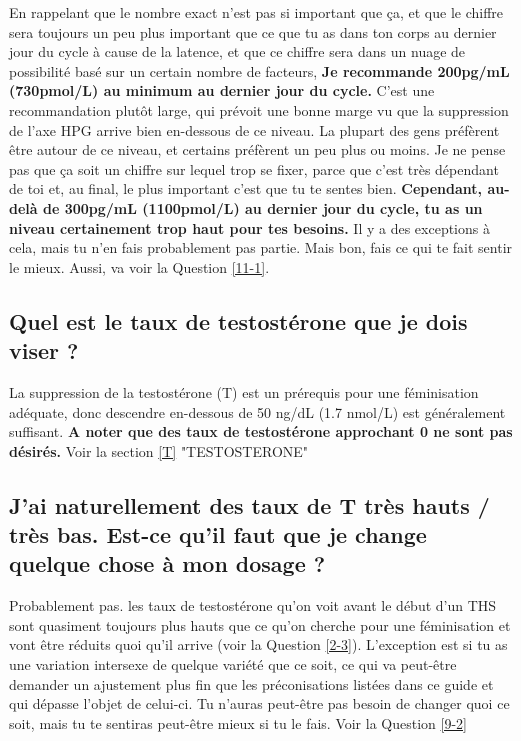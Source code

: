 \documentclass{article}
\begin{document}
En rappelant que le nombre exact n'est pas si important que ça, et que le chiffre sera toujours un peu plus important que ce que tu as dans ton corps au dernier jour du cycle à cause de la latence, et que ce chiffre sera dans un nuage de possibilité basé sur un certain nombre de facteurs, \textbf{Je recommande 200pg/mL (730pmol/L) au minimum au dernier jour du cycle.} C'est une recommandation plutôt large, qui prévoit une bonne marge vu que la suppression de l'axe HPG arrive bien en-dessous de ce niveau. La plupart des gens préfèrent être autour de ce niveau, et certains préfèrent un peu plus ou moins. Je ne pense pas que ça soit un chiffre sur lequel trop se fixer, parce que c'est très dépendant de toi et, au final, le plus important c'est que tu te sentes bien. \textbf{Cependant, au-delà de 300pg/mL (1100pmol/L) au dernier jour du cycle, tu as un niveau certainement trop haut pour tes besoins.} Il y a des exceptions à cela, mais tu n'en fais probablement pas partie. Mais bon, fais ce qui te fait sentir le mieux. Aussi, va voir la Question \ref{11-1}.

\subsection{Quel est le taux de testostérone que je dois viser ?}

La suppression de la testostérone (T) est un prérequis pour une féminisation adéquate, donc descendre en-dessous de 50 ng/dL (1.7 nmol/L) est généralement suffisant. \textbf{A noter que des taux de testostérone approchant 0 ne sont pas désirés.} Voir la section \ref{T} "TESTOSTERONE"

\subsection{J'ai naturellement des taux de T très hauts / très bas. Est-ce qu'il faut que je change quelque chose à mon dosage ?}

Probablement pas. les taux de testostérone qu'on voit avant le début d'un THS sont quasiment toujours plus hauts que ce qu'on cherche pour une féminisation et vont être réduits quoi qu'il arrive (voir la Question \ref{2-3}). L'exception est si tu as une variation intersexe de quelque variété que ce soit, ce qui va peut-être demander un ajustement plus fin que les préconisations listées dans ce guide et qui dépasse l'objet de celui-ci. Tu n'auras peut-être pas besoin de changer quoi ce soit, mais tu te sentiras peut-être mieux si tu le fais. Voir la Question \ref{9-2}
\end{document}
